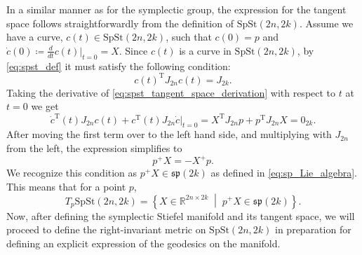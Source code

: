 In a similar manner as for the symplectic group, the expression for the tangent space follows straightforwardly from the definition of $\mathrm{SpSt}(2n, 2k)$. Assume we have a curve, $c(t)\in \mathrm{SpSt}(2n,2k)$, such that $c(0)=p$ and $\dot{c}(0)\coloneqq\tfrac{d}{dt}c(t)|_{t=0}=X$. Since $c(t)$ is a curve in $\mathrm{SpSt}(2n,2k)$, by \eqref{eq:spst_def} it must satisfy the following condition:
\begin{equation}\label{eq:spst_tangent_space_derivation}
    c(t) ^{\mathrm{T}}J_{2n}c(t)=J_{2k}.
\end{equation}
Taking the derivative of \eqref{eq:spst_tangent_space_derivation} with respect to $t$ at $t=0$ we get
\begin{equation*}
    \dot{c}^{\mathrm{T}}(t)J_{2n}c(t)+c^{\mathrm{T}}(t)J_{2n}\dot{c}\big|_{t=0}=X ^{\mathrm{T}}J_{2n}p+p ^{\mathrm{T}}J_{2n}X=0_{2k}.
\end{equation*}
After moving the first term over to the left hand side, and multiplying with $J_{2n}$ from the left, the expression simplifies to
\begin{equation*}
    p^{+}X=-X^{+}p.
\end{equation*}
We recognize this condition as $p^{+}X\in \mathfrak{sp}(2k)$ as defined in \eqref{eq:sp_Lie_algebra}. This means that for a point $p$, 
\begin{equation}\label{eq:spst_tangent_space}
    T_{p}\mathrm{SpSt}(2n,2k)=\left\{X\in \mathbb{R}^{2n\times2k}\;\middle|\;p^{+}X\in\mathfrak{sp}(2k)\right\}.
\end{equation}
Now, after defining the symplectic Stiefel manifold and its tangent space, we will proceed to define the right-invariant metric on $\mathrm{SpSt}(2n, 2k)$ in preparation for defining an explicit expression of the geodesics on the manifold. 